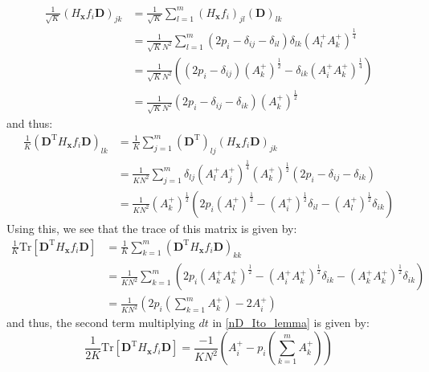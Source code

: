 \begin{align}
\frac{1}{\sqrt{K}}\left(H_{\mathbf{x}} f_i \mathbf{D}\right)_{jk} &= \frac{1}{\sqrt{K}}\sum\limits_{l=1}^{m} \left(H_{\mathbf{x}} f_i \right)_{jl}\left(\mathbf{D}\right)_{lk}\nonumber\\
&= \frac{1}{\sqrt{K}N^2}\sum\limits_{l=1}^{m}\left(2p_i - \delta_{ij} - \delta_{il}\right)\delta_{lk}\left(A^{+}_{l}A^{+}_{k}\right)^{\frac{1}{4}}\\
&=  \frac{1}{\sqrt{K}N^2}\left(\left(2p_i -\delta_{ij}\right)(A^{+}_{k})^{\frac{1}{2}} -\delta_{ik}\left(A^{+}_{i}A^{+}_{k}\right)^{\frac{1}{4}}\right)\\
&= \frac{1}{\sqrt{K}N^2}\left(2p_i -\delta_{ij} -\delta_{ik}\right)(A^{+}_{k})^{\frac{1}{2}}
\end{align}
and thus:
\begin{align}
\frac{1}{K}\left(\mathbf{D}^{\mathrm{T}} H_{\mathbf{x}} f_i \mathbf{D}\right)_{lk} &=\frac{1}{K}\sum\limits_{j=1}^{m}\left(\mathbf{D}^{\mathrm{T}}\right)_{lj}\left(H_{\mathbf{x}} f_i \mathbf{D}\right)_{jk}\nonumber\\
&=  \frac{1}{KN^2}\sum\limits_{j=1}^{m}\delta_{lj}\left(A^{+}_{l}A^{+}_{j}\right)^{\frac{1}{4}}(A^{+}_{k})^{\frac{1}{2}}\left(2p_i -\delta_{ij} -\delta_{ik}\right)\\
&=  \frac{1}{KN^2}(A^{+}_{k})^{\frac{1}{2}}\left(2p_i(A^{+}_{l})^{\frac{1}{2}} - (A^{+}_{i})^{\frac{1}{2}}\delta_{il} - (A^{+}_{l})^{\frac{1}{2}}\delta_{ik}\right)
\end{align}
Using this, we see that the trace of this matrix is given by:
\begin{align}
\frac{1}{K}\mathrm{Tr}[\mathbf{D}^{\mathrm{T}} H_{\mathbf{x}} f_i \mathbf{D}] &= \frac{1}{K}\sum\limits_{k=1}^{m}\left(\mathbf{D}^{\mathrm{T}} H_{\mathbf{x}} f_i \mathbf{D}\right)_{kk}\nonumber\\
&= \frac{1}{KN^2}\sum\limits_{k=1}^{m}\left(2p_i(A^{+}_{k}A^{+}_{k})^{\frac{1}{2}} - (A^{+}_{i}A^{+}_{k})^{\frac{1}{2}}\delta_{ik} - (A^{+}_{k}A^{+}_{k})^{\frac{1}{2}}\delta_{ik}\right)\\
&= \frac{1}{KN^2}\left(2p_i\left(\sum\limits_{k=1}^{m} A^{+}_k\right) - 2A^{+}_{i}\right)
\end{align}
and thus, the second term multiplying $dt$ in \eqref{nD_Ito_lemma} is given by:
\begin{equation}
\frac{1}{2K}\mathrm{Tr}[\mathbf{D}^{\mathrm{T}} H_{\mathbf{x}} f_i \mathbf{D}] =  \frac{-1}{KN^2}\left(A^{+}_{i}-p_i\left(\sum\limits_{k=1}^{m} A^{+}_k\right)\right)\label{nD_for_Ito_second_term}
\end{equation}
